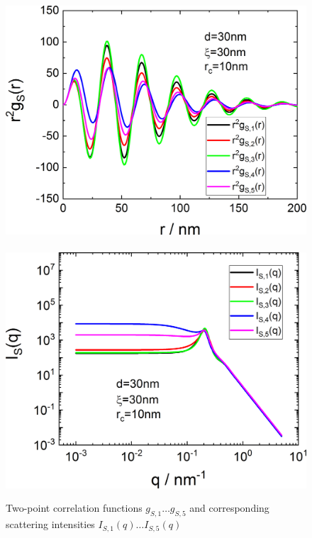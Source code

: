 \begin{figure}[htb]
{\begin{minipage}[b]{.45\linewidth}
             \includegraphics[width=1\linewidth]{../images/form_factor/nonparticular/gyr2_10.png}\\~\\
             \includegraphics[width=1\linewidth]{../images/form_factor/nonparticular/IQCRW_10.png}
    \end{minipage}
    }
\caption{Two-point correlation functions $g_{S,1}\ldots g_{S,5}$ and corresponding scattering intensities $I_{S,1}(q)\ldots I_{S,5}(q)$} \label{fig:CRWplugin}
\end{figure}

\vspace{5mm}


